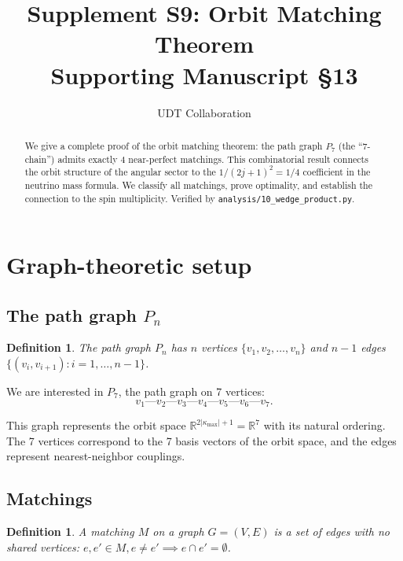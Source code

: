 \documentclass[11pt,letterpaper]{article}
\title{Supplement S9: Orbit Matching Theorem \\
\large Supporting Manuscript \S13}
\author{UDT Collaboration}
\date{}
\newtheorem{definition}[theorem]{Definition}
\numberwithin{equation}{section}
\begin{document}
\maketitle

\begin{abstract}
We give a complete proof of the orbit matching theorem: the path graph
$P_7$ (the ``7-chain'') admits exactly 4 near-perfect matchings. This
combinatorial result connects the orbit structure of the angular sector
to the $1/(2j+1)^2 = 1/4$ coefficient in the neutrino mass formula.
We classify all matchings, prove optimality, and establish the connection
to the spin multiplicity. Verified by
\texttt{analysis/10\_wedge\_product.py}.
\end{abstract}

\tableofcontents

\section{Graph-theoretic setup}
\label{sec:setup}

\subsection{The path graph $P_n$}

\begin{definition}
The \emph{path graph} $P_n$ has $n$ vertices $\{v_1, v_2, \ldots, v_n\}$
and $n-1$ edges $\{(v_i, v_{i+1}) : i = 1, \ldots, n-1\}$.
\end{definition}

We are interested in $P_7$, the path graph on 7 vertices:
\begin{equation}
  v_1 \text{---} v_2 \text{---} v_3 \text{---} v_4 \text{---}
  v_5 \text{---} v_6 \text{---} v_7.
\end{equation}

This graph represents the orbit space $\mathbb{R}^{2|\kappa_\mathrm{max}|+1} = \mathbb{R}^7$
with its natural ordering. The 7 vertices correspond to the 7 basis vectors
of the orbit space, and the edges represent nearest-neighbor couplings.

\subsection{Matchings}

\begin{definition}
A \emph{matching} $M$ on a graph $G = (V, E)$ is a set of edges with no
shared vertices: $e, e' \in M, e \neq e' \implies e \cap e' = \emptyset$.
\end{definition}
\end{document}
